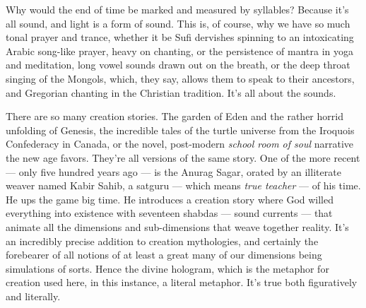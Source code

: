 Why would the end of time be marked and measured by syllables? Because
it's all sound, and light is a form of sound. This is, of course, why we
have so much tonal prayer and trance, whether it be Sufi dervishes
spinning to an intoxicating Arabic song-like prayer, heavy on chanting,
or the persistence of mantra in yoga and meditation, long vowel sounds
drawn out on the breath, or the deep throat singing of the Mongols,
which, they say, allows them to speak to their ancestors, and Gregorian
chanting in the Christian tradition. It's all about the sounds.

There are so many creation stories. The garden of Eden and the rather
horrid unfolding of Genesis, the incredible tales of the turtle universe
from the Iroquois Confederacy in Canada, or the novel, post-modern
\emph{school room of soul} narrative the new age favors. They're all
versions of the same story. One of the more recent --- only five hundred
years ago --- is the Anurag Sagar, orated by an illiterate weaver named
Kabir Sahib, a satguru --- which means \emph{true teacher} --- of his
time. He ups the game big time. He introduces a creation story where God
willed everything into existence with seventeen shabdas --- sound
currents --- that animate all the dimensions and sub-dimensions that
weave together reality. It's an incredibly precise addition to creation
mythologies, and certainly the forebearer of all notions of at least a
great many of our dimensions being simulations of sorts. Hence the
divine hologram, which is the metaphor for creation used here, in this
instance, a literal metaphor. It's true both figuratively and literally.

